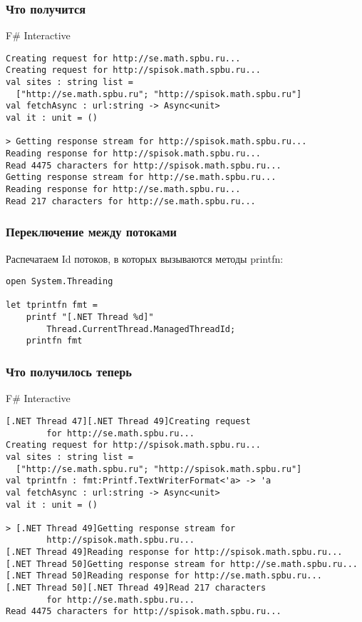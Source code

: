 \documentclass[xetex,mathserif,serif]{beamer}
\begin{document}
	\begin{frame}[fragile]
		\frametitle{Что получится}
		\begin{alertblock}{F\# Interactive}
			\begin{verbatim}
Creating request for http://se.math.spbu.ru...
Creating request for http://spisok.math.spbu.ru...
val sites : string list =
  ["http://se.math.spbu.ru"; "http://spisok.math.spbu.ru"]
val fetchAsync : url:string -> Async<unit>
val it : unit = ()

> Getting response stream for http://spisok.math.spbu.ru...
Reading response for http://spisok.math.spbu.ru...
Read 4475 characters for http://spisok.math.spbu.ru...
Getting response stream for http://se.math.spbu.ru...
Reading response for http://se.math.spbu.ru...
Read 217 characters for http://se.math.spbu.ru...
			\end{verbatim}
		\end{alertblock}
	\end{frame}

	\begin{frame}[fragile]
		\frametitle{Переключение между потоками}
		Распечатаем Id потоков, в которых вызываются методы printfn:
		\begin{verbatim}
open System.Threading

let tprintfn fmt =
    printf "[.NET Thread %d]"   
        Thread.CurrentThread.ManagedThreadId;
    printfn fmt
		\end{verbatim}
	\end{frame}

	\begin{frame}[fragile]
		\frametitle{Что получилось теперь}
		\begin{footnotesize}
			\begin{alertblock}{F\# Interactive}
				\begin{verbatim}
[.NET Thread 47][.NET Thread 49]Creating request 
        for http://se.math.spbu.ru...
Creating request for http://spisok.math.spbu.ru...
val sites : string list =
  ["http://se.math.spbu.ru"; "http://spisok.math.spbu.ru"]
val tprintfn : fmt:Printf.TextWriterFormat<'a> -> 'a
val fetchAsync : url:string -> Async<unit>
val it : unit = ()

> [.NET Thread 49]Getting response stream for 
        http://spisok.math.spbu.ru...
[.NET Thread 49]Reading response for http://spisok.math.spbu.ru...
[.NET Thread 50]Getting response stream for http://se.math.spbu.ru...
[.NET Thread 50]Reading response for http://se.math.spbu.ru...
[.NET Thread 50][.NET Thread 49]Read 217 characters 
        for http://se.math.spbu.ru...
Read 4475 characters for http://spisok.math.spbu.ru...
				\end{verbatim}
			\end{alertblock}
		\end{footnotesize}
	\end{frame}
\end{document}
